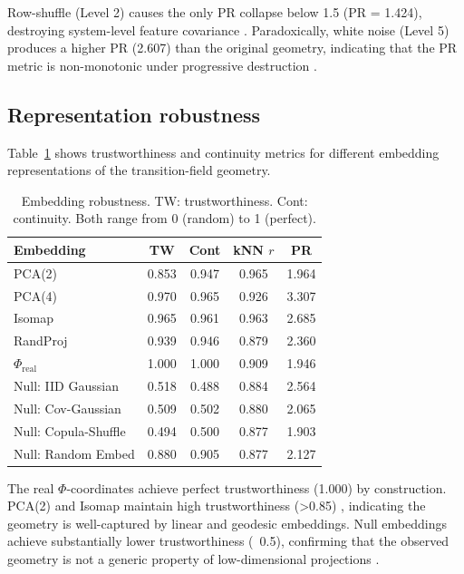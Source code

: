 \documentclass[aip,chaos,showpacs,superscriptaddress,groupedaddress]{revtex4-1}
\begin{document}
Row-shuffle (Level 2) causes the only PR collapse below 1.5 (PR = 1.424), destroying system-level feature covariance \cite{crutchfield1986equivalence}. Paradoxically, white noise (Level 5) produces a higher PR (2.607) than the original geometry, indicating that the PR metric is non-monotonic under progressive destruction \cite{verleysen2005curse}.

\subsection{Representation robustness}
\label{sec:representation}

Table~\ref{tab:robustness} shows trustworthiness and continuity metrics \cite{lee2007dimension} for different embedding representations of the transition-field geometry.

\begin{table}[h]
\centering
\caption{Embedding robustness. TW: trustworthiness. Cont: continuity. Both range from 0 (random) to 1 (perfect).}
\label{tab:robustness}
\begin{tabular}{lcccc}
\toprule
Embedding & TW & Cont & kNN $r$ & PR \\
\midrule
PCA(2) & 0.853 & 0.947 & 0.965 & 1.964 \\
PCA(4) & 0.970 & 0.965 & 0.926 & 3.307 \\
Isomap & 0.965 & 0.961 & 0.963 & 2.685 \\
RandProj & 0.939 & 0.946 & 0.879 & 2.360 \\
$\Phi_{\text{real}}$ & 1.000 & 1.000 & 0.909 & 1.946 \\
\midrule
Null: IID Gaussian & 0.518 & 0.488 & 0.884 & 2.564 \\
Null: Cov-Gaussian & 0.509 & 0.502 & 0.880 & 2.065 \\
Null: Copula-Shuffle & 0.494 & 0.500 & 0.877 & 1.903 \\
Null: Random Embed & 0.880 & 0.905 & 0.877 & 2.127 \\
\bottomrule
\end{tabular}
\end{table}

The real $\Phi$-coordinates achieve perfect trustworthiness (1.000) by construction. PCA(2) and Isomap maintain high trustworthiness (>0.85) \cite{meng2019isomap}, indicating the geometry is well-captured by linear and geodesic embeddings. Null embeddings achieve substantially lower trustworthiness (~0.5), confirming that the observed geometry is not a generic property of low-dimensional projections \cite{coifman2005geometric}.
\end{document}
